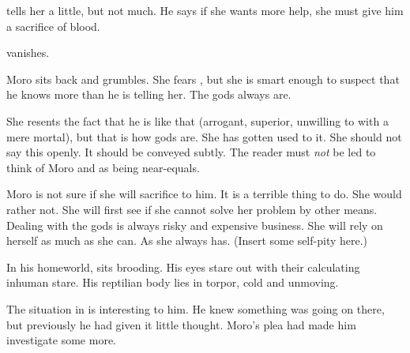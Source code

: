 % 
% 
% 
% 
% 
% 
% 
% 

\Nasshikerr tells her a little, but not much.
He says if she wants more help, she must give him a sacrifice of blood.

\Nasshikerr vanishes. 

Moro sits back and grumbles. 
She fears \Nasshikerr, but she is smart enough to suspect that he knows more than he is telling her. 
The gods always are. 

She resents the fact that he is like that (arrogant, superior, unwilling to \cooperate with a mere mortal), but that is how gods are.
She has gotten used to it. 
She should not say this openly.
It should be conveyed subtly.
The reader must \emph{not} be led to think of Moro and \Nasshikerr as being near-equals. 

Moro is not sure if she will sacrifice to him.
It is a terrible thing to do.
She would rather not.
She will first see if she cannot solve her problem by other means. 
Dealing with the gods is always risky and expensive business. 
She will rely on herself as much as she can. 
As she always has.
(Insert some self-pity here.)









\begin{comment}
  \section{\Nasshikerr broods}
\end{comment}
\new
In his homeworld, \Nasshikerr sits brooding. 
His \ophidian eyes stare out with their calculating inhuman stare. 
His reptilian body lies in torpor, cold and unmoving. 



The situation in \Malcur is interesting to him. 
He knew something was going on there, but previously he had given it little thought. 
Moro's plea had made him investigate some more. 

